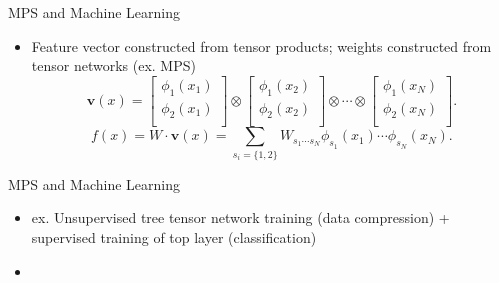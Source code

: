 \documentclass{beamer}
\begin{document}
\begin{frame}{MPS and Machine Learning}
\begin{itemize}
\item Feature vector constructed from tensor products; weights constructed from tensor networks (ex. MPS)
	\[
	\mathbf{v}(x)= \begin{bmatrix}
	\phi_1(x_{1}) \\ \phi_2(x_1)\\
	\end{bmatrix}\otimes \begin{bmatrix}
	\phi_1(x_{2}) \\\phi_2(x_2)\\
	\end{bmatrix}\otimes\cdots\otimes\begin{bmatrix}
	\phi_1(x_{N}) \\ \phi_2(x_N)\\
	\end{bmatrix}
	.\]
	\[
		f(x)=W\cdot \mathbf{v}(x)=\sum_{s_{i}=\{1,2\}}W_{s_{1}\cdots s_{N}}\phi_{s_{1}}(x_{1})\cdots\phi_{s_{N}}(x_{N})
	.\]
	
	
\end{itemize}	
\end{frame}

\begin{frame}{MPS and Machine Learning}
\begin{itemize}
\item ex. Unsupervised tree tensor network training (data compression) + supervised training of top layer (classification)
\item $$
\end{itemize}	
\\
\end{frame}
\end{document}
